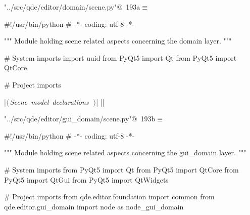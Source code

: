 \documentclass[%
    a4paper,    %
    justified,  %
    nobib,      %
    openany     %
]{tufte-book}
\makeatletter
\renewcommand{\label}[1]{\@tufte@label{##1}}%
\makeatother
\begin{document}
\begin{fullwidth}
\begin{flushleft}
\begin{minipage}{\linewidth}
\begin{list}{}{\setlength{\itemsep}{-\parsep}\setlength{\itemindent}{-\leftmargin}}
\item{}
\end{list}
\end{minipage}\vspace{4ex}
\end{flushleft}

\begin{flushleft} \small
\begin{minipage}{\linewidth}\label{scrap178}\raggedright\small
{} \verb@"../src/qde/editor/domain/scene.py"@\nobreak\ {\footnotesize {193a}}$\equiv$
\vspace{-1ex}
\begin{pythoncode}
#!/usr/bin/python
# -*- coding: utf-8 -*-

""" Module holding scene related aspects concerning the domain layer. """

# System imports
import uuid
from PyQt5 import Qt
from PyQt5 import QtCore

# Project imports


|\hbox{$\langle\,${\itshape Scene model declarations}\nobreak\ {\footnotesize {}}$\,\rangle$}|
|\NWsep|
\end{pythoncode}
\vspace{1.5ex}
\footnotesize
\begin{list}{}{\setlength{\itemsep}{-\parsep}\setlength{\itemindent}{-\leftmargin}}

\item{}
\end{list}
\end{minipage}\vspace{4ex}
\end{flushleft}
\begin{flushleft} \small
\begin{minipage}{\linewidth}\label{scrap179}\raggedright\small
{} \verb@"../src/qde/editor/gui_domain/scene.py"@\nobreak\ {\footnotesize {193b}}$\equiv$
\vspace{-1ex}
\begin{pythoncode}

#!/usr/bin/python
# -*- coding: utf-8 -*-

""" Module holding scene related aspects concerning the gui_domain layer. """

# System imports
from PyQt5 import Qt
from PyQt5 import QtCore
from PyQt5 import QtGui
from PyQt5 import QtWidgets

# Project imports
from qde.editor.foundation import common
from qde.editor.gui_domain import node as node_gui_domain


\end{pythoncode}
\end{minipage}
\end{flushleft}
\end{fullwidth}
\end{document}

